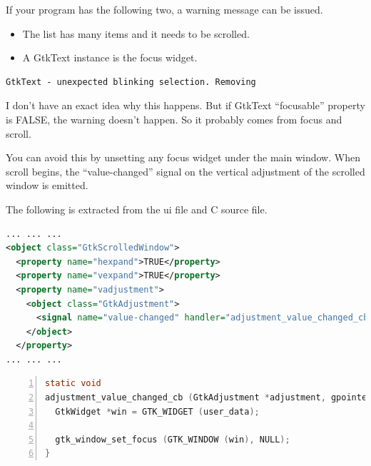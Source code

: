 If your program has the following two, a warning message can be issued.

\begin{itemize}
\tightlist
\item
  The list has many items and it needs to be scrolled.
\item
  A GtkText instance is the focus widget.
\end{itemize}

\begin{lstlisting}
GtkText - unexpected blinking selection. Removing
\end{lstlisting}

I don't have an exact idea why this happens. But if GtkText
``focusable'' property is FALSE, the warning doesn't happen. So it
probably comes from focus and scroll.

You can avoid this by unsetting any focus widget under the main window.
When scroll begins, the ``value-changed'' signal on the vertical
adjustment of the scrolled window is emitted.

The following is extracted from the ui file and C source file.

\begin{lstlisting}[language=XML]
... ... ...
<object class="GtkScrolledWindow">
  <property name="hexpand">TRUE</property>
  <property name="vexpand">TRUE</property>
  <property name="vadjustment">
    <object class="GtkAdjustment">
      <signal name="value-changed" handler="adjustment_value_changed_cb" swapped="no" object="LeWindow"/>
    </object>
  </property>
... ... ...  
\end{lstlisting}

\begin{lstlisting}[language=C, numbers=left]
static void
adjustment_value_changed_cb (GtkAdjustment *adjustment, gpointer user_data) {
  GtkWidget *win = GTK_WIDGET (user_data);

  gtk_window_set_focus (GTK_WINDOW (win), NULL);
}
\end{lstlisting}
